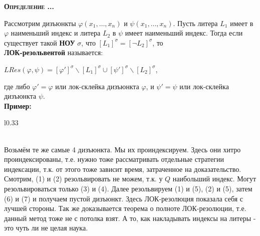 \documentclass[18pt, a4paper]{extarticle}
\newcounter{par}
\newcounter{spar}
\newcounter{zap}
\newcommand{\opr}{\textbf{\textsc{Определение \thepar.\if\thespar1\thespar.\fi\thezap.\;}}\stepcounter{zap}}
\newcommand{\primer}{\textbf{Пример:\;}}
\newcommand{\vp}{\varphi}
\newcommand{\res}[2]{Res(#1,#2)}
\newcommand{\sg}{\sigma}
\newcommand{\lot}[3]{#1_#2,\dots,#1_#3}
\begin{document}
\opr 

Рассмотрим дизъюнкты $\vp(\lot x 1 n)$ и $\psi(\lot x 1 n)$. Пусть литера $L_1$ имеет в $\vp$ наименьший индекс и литера $L_2$ в $\psi$ имеет наименьший индекс. Тогда если существует такой \textbf{НОУ} $\sg$, что $[L_1]^\sg=[\lnot L_2]^\sg$, то\\ \textbf{ЛОК-резольвентой} называется:
\begin{center}
    $L\res \vp \psi=[\vp']^\sg\backslash[L_1]^\sg\cup[\psi']^\sg\backslash[L_2]^\sg$, 
\end{center}
где либо $\vp'=\vp$ или лок-склейка дизъюнкта $\vp$, и $\psi'=\psi$ или лок-склейка дизъюнкта $\psi$.\\

\primer

\begin{wrapfigure}[11]{l}{0.33\textwidth}
\end{wrapfigure}
\leavevmode\\
Возьмём те же самые 4 дизъюнкта. Мы их проиндексируем. Здесь они хитро проиндексированы, т.е. нужно тоже рассматривать отдельные стратегии индексации, т.к. от этого тоже зависит время, затраченное на доказательство. Смотрим, (1) и (2) резольвировать не можем, т.к. у $Q$ наибольший индекс. Могут резольвироваться только (3) и (4). Далее резольвируем (1) и (5), (2) и (5), затем (6) и (7) и получаем пустой дизъюнкт. Здесь ЛОК-резолюция показала себя с лучшей стороны. Так же доказывается теорема о полноте ЛОК-резолюции, т.е. данный метод тоже не с потолка взят. А то, как накладывать индексы на литеры - это чуть ли не целая наука.
\end{document}
